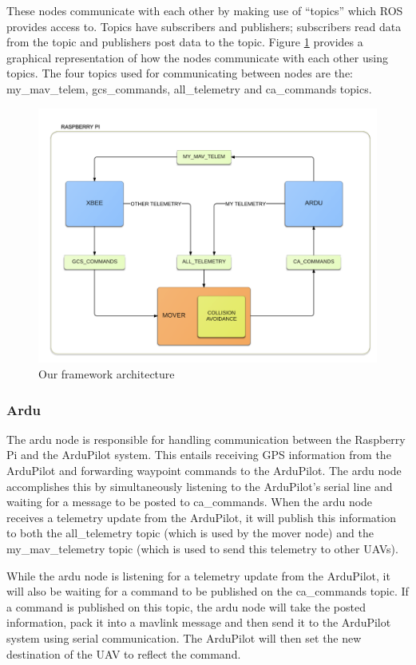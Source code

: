 \documentclass[conference]{IEEEtran}
\begin{document}
These nodes communicate with each other by making use of “topics” which ROS provides access to. Topics have subscribers and publishers; subscribers read data from the topic and publishers post data to the topic. Figure \ref{fig:ROSDistributedSystem} provides a graphical representation of how the nodes communicate with each other using topics.  The four topics used for communicating between nodes are the: my\_mav\_telem, gcs\_commands, all\_telemetry and ca\_commands topics.  

\begin{figure}  [h]
  \includegraphics [width=1\columnwidth] {ROSDistributedSystem}
  \caption{Our framework architecture}
  \label{fig:ROSDistributedSystem}
\end{figure}
\subsubsection{Ardu}

The ardu node is responsible for handling communication between the Raspberry Pi and the ArduPilot system.  This entails receiving GPS information from the ArduPilot and forwarding waypoint commands to the ArduPilot. The ardu node accomplishes this by simultaneously listening to the ArduPilot’s serial line and waiting for a message to be posted to ca\_commands. When the ardu node receives a telemetry update from the ArduPilot, it will publish this information to both the all\_telemetry topic (which is used by the mover node) and the my\_mav\_telemetry topic (which is used to send this telemetry to other UAVs).  

While the ardu node is listening for a telemetry update from the ArduPilot, it will also be waiting for a command to be published on the ca\_commands topic.  If a command is published on this topic, the ardu node will take the posted information, pack it into a mavlink message and then send it to the ArduPilot system using serial communication.  The ArduPilot will then set the new destination of the UAV to reflect the command.
\end{document}

